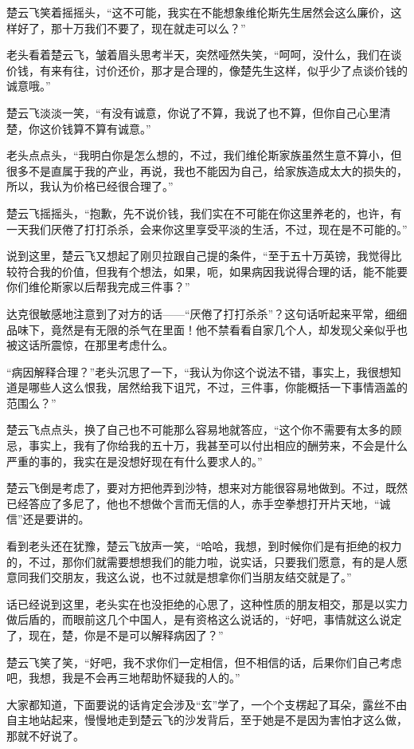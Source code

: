 楚云飞笑着摇摇头，“这不可能，我实在不能想象维伦斯先生居然会这么廉价，这样好了，那十万我们不要了，现在就走可以么？”

老头看着楚云飞，皱着眉头思考半天，突然哑然失笑，“呵呵，没什么，我们在谈价钱，有来有往，讨价还价，那才是合理的，像楚先生这样，似乎少了点谈价钱的诚意哦。”

楚云飞淡淡一笑，“有没有诚意，你说了不算，我说了也不算，但你自己心里清楚，你这价钱算不算有诚意。”

老头点点头，“我明白你是怎么想的，不过，我们维伦斯家族虽然生意不算小，但很多不是直属于我的产业，再说，我也不能因为自己，给家族造成太大的损失的，所以，我认为价格已经很合理了。”

楚云飞摇摇头，“抱歉，先不说价钱，我们实在不可能在你这里养老的，也许，有一天我们厌倦了打打杀杀，会来你这里享受平淡的生活，不过，现在是不可能的。”

说到这里，楚云飞又想起了刚贝拉跟自己提的条件，“至于五十万英镑，我觉得比较符合我的价值，但我有个想法，如果，呃，如果病因我说得合理的话，能不能要你们维伦斯家以后帮我完成三件事？”

达克很敏感地注意到了对方的话——“厌倦了打打杀杀”？这句话听起来平常，细细品味下，竟然是有无限的杀气在里面！他不禁看看自家几个人，却发现父亲似乎也被这话所震惊，在那里考虑什么。

“病因解释合理？”老头沉思了一下，“我认为你这个说法不错，事实上，我很想知道是哪些人这么恨我，居然给我下诅咒，不过，三件事，你能概括一下事情涵盖的范围么？”

楚云飞点点头，换了自己也不可能那么容易地就答应，“这个你不需要有太多的顾忌，事实上，我有了你给我的五十万，我甚至可以付出相应的酬劳来，不会是什么严重的事的，我实在是没想好现在有什么要求人的。”

楚云飞倒是考虑了，要对方把他弄到沙特，想来对方能很容易地做到。不过，既然已经答应了多尼了，他也不想做个言而无信的人，赤手空拳想打开片天地，“诚信”还是要讲的。

看到老头还在犹豫，楚云飞放声一笑，“哈哈，我想，到时候你们是有拒绝的权力的，不过，那你们就需要想想我们的能力啦，说实话，只要我们愿意，有的是人愿意同我们交朋友，我这么说，也不过就是想拿你们当朋友结交就是了。”

话已经说到这里，老头实在也没拒绝的心思了，这种性质的朋友相交，那是以实力做后盾的，而眼前这几个中国人，是有资格这么说话的，“好吧，事情就这么说定了，现在，楚，你是不是可以解释病因了？”

楚云飞笑了笑，“好吧，我不求你们一定相信，但不相信的话，后果你们自己考虑吧，我想，我是不会再三地帮助怀疑我的人的。”

大家都知道，下面要说的话肯定会涉及“玄”学了，一个个支楞起了耳朵，露丝不由自主地站起来，慢慢地走到楚云飞的沙发背后，至于她是不是因为害怕才这么做，那就不好说了。


